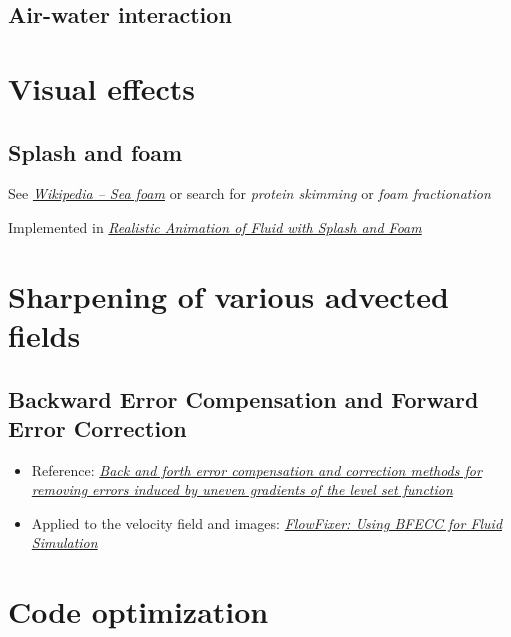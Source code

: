 \subsection{Air-water interaction}

\section{Visual effects}

\subsection{Splash and foam}

See \textit{\href{http://en.wikipedia.org/wiki/Sea_foam}{Wikipedia -- Sea foam}} or search for \textit{protein skimming} or \textit{foam fractionation}

Implemented in \textit{\href{http://nguyendangbinh.org/Proceedings/Eurographics/2003/cgf/volume22/issue3/paper127/paper127.pdf}{Realistic Animation of Fluid with Splash and Foam}}

\section{Sharpening of various advected fields}

\subsection{Backward Error Compensation and Forward Error Correction}

\begin{itemize}
    \item Reference: \textit{\href{http://smartech.gatech.edu/xmlui/bitstream/handle/1853/29473/2002-389.pdf}{Back and forth error compensation and correction methods for removing errors induced by uneven gradients of the level set function}}
    \item Applied to the velocity field and images: \textit{\href{http://www.gvu.gatech.edu/~jarek/papers/FlowFixer.pdf}{FlowFixer: Using BFECC for Fluid Simulation}}
\end{itemize}

\section{Code optimization}